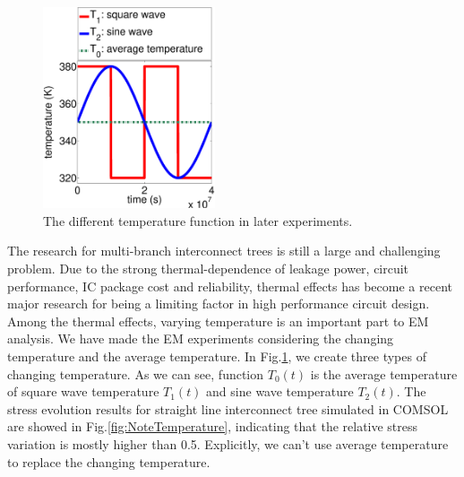\begin{figure}[!h]
\centering
\includegraphics[width=2in]{DifferentTemperature.eps}
\caption{The different temperature function in later experiments.}
\label{fig:NTTemperature}
\end{figure}

The research for multi-branch interconnect trees is still a large and challenging problem. Due to the strong thermal-dependence of leakage power, circuit performance, IC package cost and reliability, thermal effects has become a recent major research for being a limiting factor in high performance circuit design. Among the thermal effects, varying temperature is an important part to EM analysis. We have made the EM experiments considering the changing temperature and the average temperature. In Fig.\ref{fig:NTTemperature}, we create three types of changing temperature. As we can see, function $T_0(t)$ is the average temperature of square wave temperature $T_1(t)$ and sine wave temperature $T_2(t)$. The stress evolution results for straight line interconnect tree simulated in COMSOL are showed in Fig.\ref{fig:NoteTemperature}, indicating that the relative stress variation is mostly higher than 0.5. Explicitly, we can't use average temperature to replace the changing temperature.

